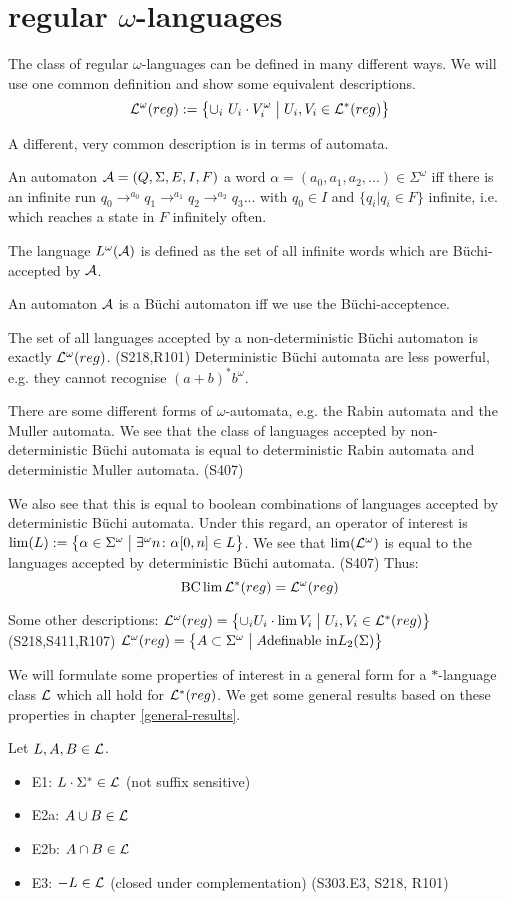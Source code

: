 \section{regular $\omega$-languages}
\label{reg-omega-lang}

The class of regular $\omega$-languages can be defined in many different ways. We will use one common definition and show some equivalent descriptions.
\[ \Lang^\omega(reg) := \Set{ \cup_i\ U_i \cdot V_i^\omega }{ U_i, V_i \in \Lang^*(reg) } \]

A different, very common description is in terms of automata.

An automaton $\mathcal{A} = (Q, \Sigma, E, I, F)$  a word $\alpha = (a_0,a_1,a_2,...) \in \Sigma^\omega$ iff there is an infinite run $q_0 \rightarrow^{a_0} q_1 \rightarrow^{a_1} q_2 \rightarrow^{a_2} q_3 ...$ with $q_0 \in I$ and $\{ q_i | q_i \in F \}$ infinite, i.e. which reaches a state in $F$ infinitely often.

The language $L^\omega(\mathcal{A})$ is defined as the set of all infinite words which are Büchi-accepted by  $\mathcal{A}$.

An automaton $\mathcal{A}$ is a Büchi automaton iff we use the Büchi-acceptence.

The set of all languages accepted by a non-deterministic Büchi automaton is exactly $\mathcal{L}^\omega(reg)$. (S218,R101) Deterministic Büchi automata are less powerful, e.g. they cannot recognise $(a+b)^* b^\omega$.

There are some different forms of $\omega$-automata, e.g. the Rabin automata and the Muller automata. We see that the class of languages accepted by non-deterministic Büchi automata is equal to deterministic Rabin automata and deterministic Muller automata. (S407)

We also see that this is equal to boolean combinations of languages accepted by deterministic Büchi automata. Under this regard, an operator of interest is $\lim(L) := \Set{ \alpha \in \Sigma^\omega }{ \exists^\omega n \colon \alpha[0,n] \in L }$. We see that $\lim(\mathcal{L}^\omega)$ is equal to the languages accepted by deterministic Büchi automata. (S407) Thus:
\[  \operatorname{BC} \lim \mathcal{L}^*(reg) = \mathcal{L}^\omega(reg) \]

Some other descriptions:
$\Lang^\omega(reg) = \Set{ \cup_i U_i \cdot \lim V_i }{ U_i, V_i \in \Lang^*(reg) }$ (S218,S411,R107)
$\Lang^\omega(reg) = \Set{A \subset \Sigma^\omega}{A \text{definable in} L_2(\Sigma)}$

We will formulate some properties of interest in a general form for a $*$-language class $\mathcal{L}$ which all hold for $\mathcal{L}^*(reg)$. We get some general results based on these properties in chapter \ref{general-results}.

Let $L,A,B \in \mathcal{L}$.
\begin{itemize}
\item E1: $L \cdot \Sigma^* \in \mathcal{L}$ (not suffix sensitive)
\item E2a: $A \cup B \in \mathcal{L}$
\item E2b: $A \cap B \in \mathcal{L}$
\item E3: $- L \in \mathcal{L}$ (closed under complementation) (S303.E3, S218, R101)
\end{itemize}
